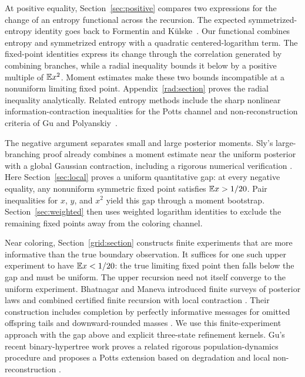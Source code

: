 At positive equality, Section~\ref{sec:positive} compares two expressions
for the change of an entropy functional across the recursion.
The expected symmetrized-entropy identity goes back to Formentin and
K\"ulske~\cite[Proposition~3.3 and equation~(15)]{FormentinKulske2009Entropy}.
Our functional combines entropy and symmetrized entropy with a quadratic
centered-logarithm term. The fixed-point identities express its change
through the correlation generated by
combining branches, while a radial inequality bounds it below by a
positive multiple of $\mathbb E x^2$. Moment estimates make these two bounds
incompatible at a nonuniform limiting fixed point. Appendix~\ref{rad:section}
proves the radial inequality analytically. Related entropy methods
include the sharp nonlinear information-contraction inequalities for the
Potts channel and non-reconstruction criteria of Gu and
Polyanskiy~\cite{GuPolyanskiy2023}.

The negative argument separates small and large posterior moments.
Sly's large-branching proof already combines a moment estimate near the
uniform posterior with a global Gaussian contraction, including a
rigorous numerical verification
\cite[Section~1.5, Lemmas~4.7--4.8, and Appendix~A]{Sly2011}.
Here Section~\ref{sec:local} proves a uniform quantitative gap: at every
negative equality, any nonuniform symmetric fixed point satisfies
$\mathbb E x>1/20$. Pair inequalities for $x$, $y$, and $x^2$ yield this gap
through a moment bootstrap. Section~\ref{sec:weighted} then uses weighted
logarithm identities to exclude the remaining fixed points away from
the coloring channel.

Near coloring, Section~\ref{grid:section} constructs finite experiments
that are more informative than the true boundary observation. It
suffices for one such upper experiment to have $\mathbb E x<1/20$: the true
limiting fixed point then falls below the gap and must be uniform.
The upper recursion need not itself converge to the uniform experiment.
Bhatnagar and Maneva introduced finite surveys of posterior laws and
combined certified finite recursion with local contraction
\cite[Sections~3.1--3.3 and Theorem~12]{BhatnagarManeva2011}.
Their construction includes completion by perfectly informative messages
for omitted offspring tails and downward-rounded masses
\cite[Section~3.3, implementation remarks~1 and~4]{BhatnagarManeva2011}.
We use this finite-experiment approach with the gap above and explicit
three-state refinement kernels. Gu's recent binary-hypertree work proves
a related rigorous population-dynamics procedure and proposes a Potts
extension based on degradation and local non-reconstruction
\cite[Sections~4 and~7]{Gu2026Hypertrees}.

